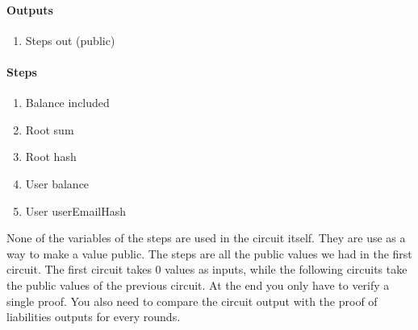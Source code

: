 \paragraph{Outputs}
\begin{enumerate}
    \item Steps out (public)
    \end{enumerate}

    \paragraph{Steps}
    \begin{enumerate}
        \item Balance included
        \item Root sum
        \item Root hash
        \item User balance
        \item User userEmailHash
        \end{enumerate}
None of the variables of the steps are used in the circuit itself. They are use as a way to make a value public.
The steps are all the public values we had in the first circuit.
The first circuit takes 0 values as inputs, while the following circuits take the public values of the previous circuit.
At the end you only have to verify a single proof. You also need to compare the circuit output with the proof of liabilities outputs for every rounds.

